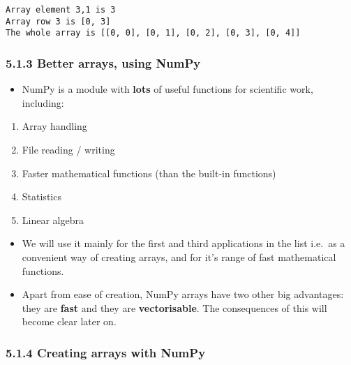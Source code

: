 \documentclass[10pt]{article}
\providecommand{\tightlist}{%
      \setlength{\itemsep}{0pt}\setlength{\parskip}{0pt}}
\begin{document}
    \begin{Verbatim}[commandchars=\\\{\}]
Array element 3,1 is 3
Array row 3 is [0, 3]
The whole array is [[0, 0], [0, 1], [0, 2], [0, 3], [0, 4]]

    \end{Verbatim}

    \hypertarget{better-arrays-using-numpy}{%
\subsubsection*{5.1.3 Better arrays, using
NumPy}\label{better-arrays-using-numpy}}

\begin{itemize}
\tightlist
\item
  NumPy is a module with \textbf{lots} of useful functions for
  scientific work, including:
\end{itemize}

\begin{enumerate}
\def\labelenumi{\arabic{enumi}.}
\tightlist
\item
  Array handling
\item
  File reading / writing
\item
  Faster mathematical functions (than the built-in functions)
\item
  Statistics
\item
  Linear algebra
\end{enumerate}

\begin{itemize}
\tightlist
\item
  We will use it mainly for the first and third applications in the list
  i.e.~as a convenient way of creating arrays, and for it's range of
  fast mathematical functions.
\item
  Apart from ease of creation, NumPy arrays have two other big
  advantages: they are \textbf{fast} and they are \textbf{vectorisable}.
  The consequences of this will become clear later on.
\end{itemize}

\hypertarget{creating-arrays-with-numpy}{%
\subsubsection*{5.1.4 Creating arrays with
NumPy}\label{creating-arrays-with-numpy}}
\end{document}
